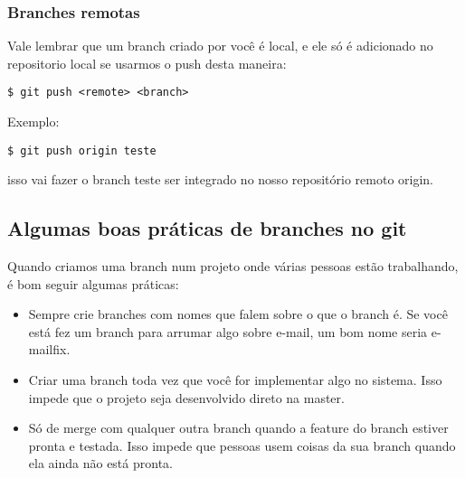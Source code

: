 \documentclass{article}
\begin{document}
\subsubsection{Branches remotas}

Vale lembrar que um branch criado por você é local, e ele só é adicionado no repositorio 
local se usarmos o push desta maneira:
\begin{tabbing}
    \hspace{1cm}\=\verb#$ git push <remote> <branch>#\\
\end{tabbing} 
Exemplo: 
\begin{tabbing}
    \hspace{1cm}\=\verb#$ git push origin teste#\\
\end{tabbing} 
isso vai fazer o branch teste ser integrado no nosso repositório remoto origin.

\subsection{Algumas boas práticas de branches no git}
    Quando criamos uma branch num projeto onde várias pessoas estão trabalhando, é
bom seguir algumas práticas:
\begin{itemize}
    \item Sempre crie branches com nomes que falem sobre o que o branch é. Se
            você está fez um branch para arrumar algo sobre e-mail, um bom nome
            seria e-mailfix.
    \item Criar uma branch toda vez que você for implementar algo no sistema.
            Isso impede que o projeto seja desenvolvido direto na master.
    \item Só de merge com qualquer outra branch quando a feature do branch 
            estiver pronta e testada. Isso impede que pessoas usem coisas
            da sua branch quando ela ainda não está pronta.
\end{itemize}
\end{document}
